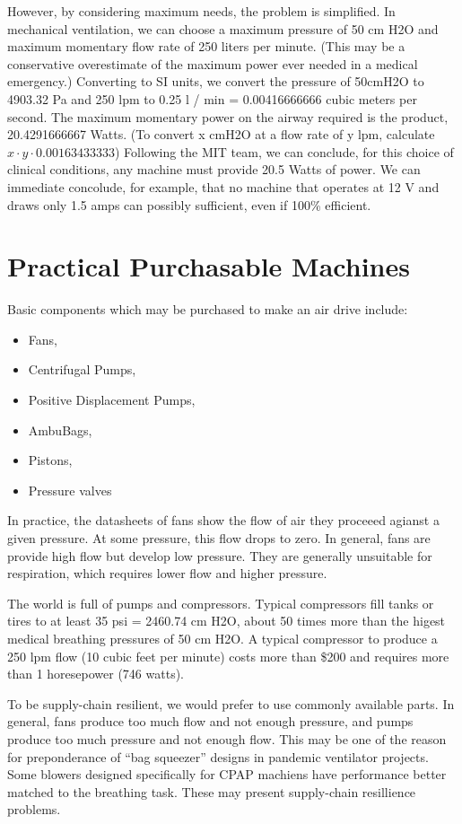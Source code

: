 \documentclass{article}
\begin{document}
However, by considering maximum needs, the problem is simplified. In mechanical ventilation,
we can choose a maximum pressure of 50 cm H2O and maximum momentary flow rate of 250 liters per minute.
(This may be a conservative overestimate of the maximum power ever needed in a medical emergency.)
Converting to SI units, we convert the pressure of 50cmH2O to 4903.32 Pa and 250 lpm to 0.25 l / min = 0.00416666666 cubic meters per second.
The maximum momentary power on the airway required is the product, 20.4291666667 Watts.
(To convert x cmH2O at a flow rate of y lpm, calculate $x \cdot y \cdot 0.00163433333$)
Following the MIT team, we can conclude, for this choice of clinical conditions, any
machine must provide 20.5 Watts of power. We can immediate concolude, for example, that no machine
that operates at 12 V and draws only 1.5 amps can possibly sufficient, even if 100\% efficient.

\section{Practical Purchasable Machines}

Basic components which may be purchased to make an air drive include:
\begin{itemize}
\item Fans,
\item Centrifugal Pumps,
\item Positive Displacement Pumps,
\item AmbuBags,
\item Pistons,
  \item Pressure valves
\end{itemize}

In practice, the datasheets of fans show the flow of air they proceeed agianst a given pressure. At some pressure,
this flow drops to zero. In general, fans are provide high flow but develop low pressure. They are generally unsuitable
for respiration, which requires lower flow and higher pressure.

The world is full of pumps and compressors. Typical compressors fill tanks or tires to at least 35 psi = 2460.74 cm H2O,
about 50 times more than the higest medical breathing pressures of 50 cm H2O. A typical compressor to produce a 250 lpm
flow (10 cubic feet per minute) costs more than \$200 and requires more than 1 horesepower (746 watts).

To be supply-chain resilient, we would prefer to use commonly available parts.
In general, fans produce too much flow and not enough pressure, and pumps produce too much pressure and not enough flow.
This may be one of the reason for preponderance of ``bag squeezer'' designs in pandemic ventilator projects.
Some blowers designed specifically for CPAP machiens have performance better matched to the breathing task.
These may present supply-chain resillience problems.
\end{document}
